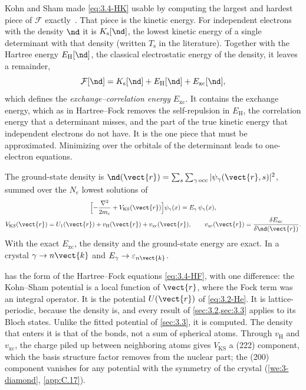 Kohn and Sham made \cref{eq:3.4-HK} usable by computing the largest and hardest piece of $\mathcal{F}$ exactly~\cite{kohn1965self}. That piece is the kinetic energy. For independent electrons with the density $\nd$ it is $K_{\mathrm{s}}[\nd]$, the lowest kinetic energy of a single determinant with that density (written $T_{\mathrm{s}}$ in the literature). Together with the Hartree energy $E_{\mathrm{H}}[\nd]$, the classical electrostatic energy of the density, it leaves a remainder,
\begin{equation*}
  \mathcal{F}[\nd] = K_{\mathrm{s}}[\nd] + E_{\mathrm{H}}[\nd] + E_{\mathrm{xc}}[\nd] ,
\end{equation*}
which defines the \emph{exchange--correlation energy} $E_{\mathrm{xc}}$. It contains the exchange energy, which as in Hartree--Fock removes the self-repulsion in $E_{\mathrm{H}}$, the correlation energy that a determinant misses, and the part of the true kinetic energy that independent electrons do not have. It is the one piece that must be approximated. Minimizing over the orbitals of the determinant leads to one-electron equations.
\begin{keyresult}
The ground-state density is $\nd(\vect{r}) = \sum_s\sum_{\gamma\,\mathrm{occ}}|\psi_\gamma(\vect{r}, s)|^2$, summed over the $N_e$ lowest solutions of
\begin{equation}
  \begin{gathered}
  \Bigl[-\frac{\nabla^2}{2m_e} + V_{\mathrm{KS}}(\vect{r})\Bigr]\psi_\gamma(x) = E_\gamma\,\psi_\gamma(x) , \\
  V_{\mathrm{KS}}(\vect{r}) = U_1(\vect{r}) + v_{\mathrm{H}}(\vect{r}) + v_{\mathrm{xc}}(\vect{r}) , \qquad
  v_{\mathrm{xc}}(\vect{r}) = \frac{\delta E_{\mathrm{xc}}}{\delta\nd(\vect{r})} .
  \end{gathered}
  \label{eq:3.4-KS}
\end{equation}
With the exact $E_{\mathrm{xc}}$, the density and the ground-state energy are exact. In a crystal $\gamma \to n\vect{k}$ and $E_\gamma \to \varepsilon_{n\vect{k}}$.
\end{keyresult}
 has the form of the Hartree--Fock equations \cref{eq:3.4-HF}, with one difference: the Kohn--Sham potential is a local function of $\vect{r}$, where the Fock term was an integral operator. It is the potential $U(\vect{r})$ of \cref{eq:3.2-He}. It is lattice-periodic, because the density is, and every result of \cref{sec:3.2,sec:3.3} applies to its Bloch states. Unlike the fitted potential of \cref{sec:3.3}, it is computed. The density that enters it is that of the bonds, not a sum of spherical atoms. Through $v_{\mathrm{H}}$ and $v_{\mathrm{xc}}$, the charge piled up between neighboring atoms gives $V_{\mathrm{KS}}$ a (222) component, which the basis structure factor removes from the nuclear part; the (200) component vanishes for any potential with the symmetry of the crystal (\cref{we:3-diamond}, \cref{app:C.17}).

